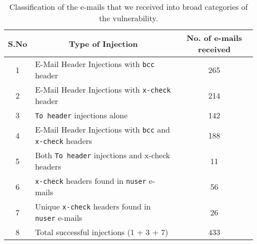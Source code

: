 \begin{table}[!htbp]
	\centering
	\begin{tabular}{|c|l|c|}
		\hline
		\multicolumn{1}{|c|}{\textbf{S.No}} &
		\multicolumn{1}{c|}{\textbf{Type of Injection}} &
		\multicolumn{1}{p{3cm}|}{\centering \textbf{No. of e-mails received}}\\
		\hline
		1 & E-Mail Header Injections with \texttt{bcc} header & 265\\
		\hline
		2 & E-Mail Header Injections with \texttt{x-check} header & 214\\
		\hline
		3 & \texttt{To header} injections alone & 142\\
		\hline
		4 & E-Mail Header Injections with \texttt{bcc} and \texttt{x-check} headers & 188\\
		\hline
		5 & Both \texttt{To header} injections and x-check headers &
		11\\
		\hline
		6 & \texttt{x-check} headers found in \texttt{nuser} e-mails & 56\\
		\hline
		7 & Unique \texttt{x-check} headers found in \texttt{nuser} e-mails & 26\\
		\hline
		8 & Total successful injections (1 + 3 + 7) & 433\\
		
		\hline
	\end{tabular}
	\caption[]{Classification of the e-mails that we received into broad categories of the vulnerability.}
	\label{tab:analysis}
\end{table}